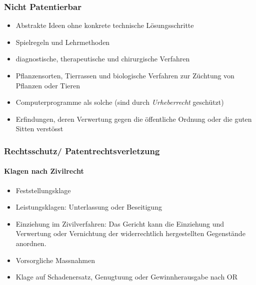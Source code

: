 \subsubsection{Nicht Patentierbar}
\begin{minipage}{0.5\linewidth}
    \begin{itemize}
        \item Abstrakte Ideen ohne konkrete technische Lösungsschritte
        \item Spielregeln und Lehrmethoden
        \item diagnostische, therapeutische und chirurgische Verfahren
    \end{itemize}
\end{minipage}
\begin{minipage}{0.5\linewidth}
    \begin{itemize}
        \item Pflanzensorten, Tierrassen und biologische Verfahren zur Züchtung von Pflanzen oder Tieren
        \item Computerprogramme als solche (sind durch \textit{Urheberrecht} geschützt)
        \item Erfindungen, deren Verwertung gegen die öffentliche Ordnung oder die guten Sitten verstösst
    \end{itemize}
\end{minipage}

\subsubsection{Rechtsschutz/ Patentrechtsverletzung}

\paragraph{Klagen nach Zivilrecht}
\begin{itemize}
    \item Feststellungsklage
    \item Leistungsklagen: Unterlassung oder Beseitigung
    \item Einziehung im Zivilverfahren: Das Gericht kann die Einziehung und Verwertung oder Vernichtung der widerrechtlich hergestellten Gegenstände anordnen.
    \item Vorsorgliche Massnahmen
    \item Klage auf Schadenersatz, Genugtuung oder Gewinnherausgabe nach OR
\end{itemize}

